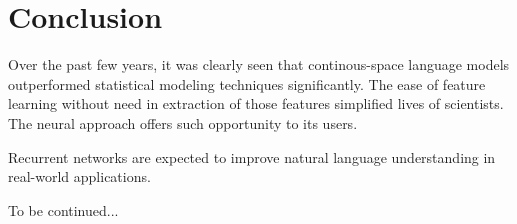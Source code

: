 \documentclass{IEEEtran}
\begin{document}
\section{Conclusion}

Over the past few years, it was clearly seen that continous-space language models outperformed statistical modeling techniques significantly. The ease of feature learning without need in extraction of those features simplified lives of scientists. The neural approach offers such opportunity to its users.

Recurrent networks are expected to improve natural language understanding in real-world applications.

To be continued...




\printbibliography
\end{document}
